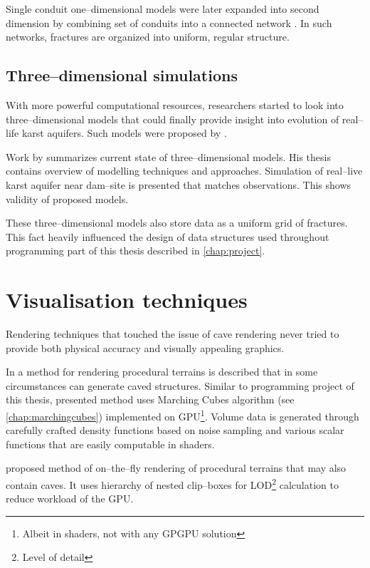 Single conduit one--dimensional models were later expanded into second dimension
by combining set of conduits into a connected network \parencite[pp. 4--5]{hiller2013}.
In such networks, fractures are organized into uniform, regular structure.

\subsection{Three--dimensional simulations}

With more powerful computational resources, researchers started to look into
three--dimensional models that could finally provide insight into evolution
of real--life karst aquifers. Such models were proposed by
\cites{annable2003}{WRCR:WRCR9525}{Kaufmann2010241}.

Work by \cite{hiller2013} summarizes current state of three--dimensional models.
His thesis contains overview of modelling techniques and approaches. Simulation
of real--live karst aquifer near dam--site is presented that matches
observations. This shows validity of proposed models.

These three--dimensional models also store data as a uniform grid of fractures.
This fact heavily influenced the design of data structures used throughout
programming part of this thesis described in \autoref{chap:project}.

\section{Visualisation techniques}

Rendering techniques that touched the issue of cave rendering never tried to
provide both physical accuracy and visually appealing graphics.

In \cite{gpugems3ch01} a method for rendering procedural terrains is described
that in some circumstances can generate caved structures. Similar to programming
project of this thesis, presented method uses Marching Cubes algorithm
(see \autoref{chap:marchingcubes}) implemented on GPU\footnote{Albeit in shaders,
not with any GPGPU solution}. Volume data is generated through carefully crafted
density functions based on noise sampling and various scalar
functions that are easily computable in shaders.

\Cite{forstmann2005} proposed method of on--the--fly rendering of procedural
terrains that may also contain caves. It uses hierarchy of nested clip--boxes
for LOD\footnote{Level of detail} calculation to reduce workload of the GPU.

